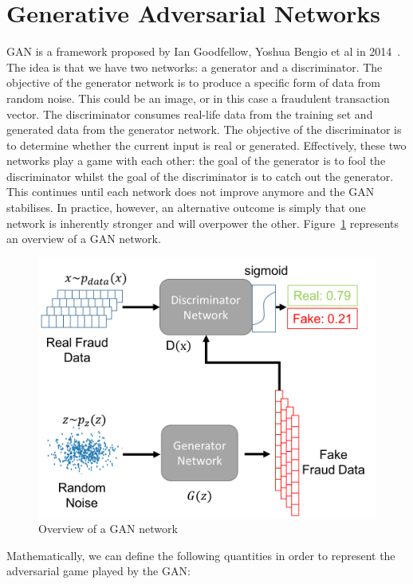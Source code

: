 \documentclass[12pt,a4paper,twoside]{report}
\begin{document}
\section{Generative Adversarial Networks}
GAN is a framework proposed by Ian Goodfellow, Yoshua Bengio et al in 2014~\cite{2014arXiv1406.2661G}. The idea is that we have two networks: a generator and a discriminator. The objective of the generator network is to produce a specific form of data from random noise. This could be an image, or in this case a fraudulent transaction vector. The discriminator consumes real-life data from the training set and generated data from the generator network. The objective of the discriminator is to determine whether the current input is real or generated. Effectively, these two networks play a game with each other: the goal of the generator is to fool the discriminator whilst the goal of the discriminator is to catch out the generator. This continues until each network does not improve anymore and the GAN stabilises. In practice, however, an alternative outcome is simply that one network is inherently stronger and will overpower the other. Figure~\ref{fig:gan-overview-prep} represents an overview of a GAN network.

\begin{figure}[!htbp]

\centering
\includegraphics[width=\textwidth]{GAN-Overview-withequations}
\caption{Overview of a GAN network}
\label{fig:gan-overview-prep}
\end{figure}

Mathematically, we can define the following quantities in order to represent the adversarial game played by the GAN:
\end{document}
